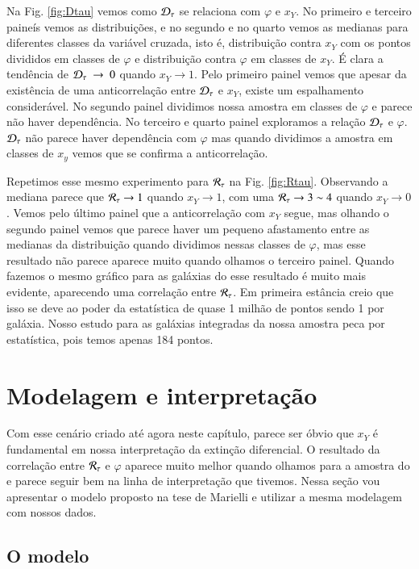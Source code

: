 Na Fig. \ref{fig:Dtau} vemos como $\mathcal{D}_\tau$ se relaciona com $\varphi$ e $x_Y$. No primeiro e
terceiro paineís vemos as distribuições, e no segundo e no quarto vemos as medianas para diferentes
classes da variável cruzada, isto é, distribuição contra $x_Y$ com os pontos divididos em classes de
$\varphi$ e distribuição contra $\varphi$ em classes de $x_Y$. É clara a tendência de $\mathcal{D}_\tau\ \to\
0$ quando $x_Y \to 1$. Pelo primeiro painel vemos que apesar da existência de uma anticorrelação
entre $\mathcal{D}_\tau$ e $x_Y$, existe um espalhamento considerável. No segundo painel dividimos nossa
amostra em classes de $\varphi$ e parece não haver dependência. No terceiro e quarto painel
exploramos a relação $\mathcal{D}_\tau$ e $\varphi$. $\mathcal{D}_\tau$ não parece haver dependência com $\varphi$ mas
quando dividimos a amostra em classes de $x_y$ vemos que se confirma a anticorrelação.

Repetimos esse mesmo experimento para $\mathcal{R}_\tau$ na Fig. \ref{fig:Rtau}. Observando a mediana parece
que $\mathcal{R}_\tau \to 1$ quando $x_Y \to 1$, com uma $\mathcal{R}_\tau \to 3 \sim 4$ quando $x_Y \to 0$. Vemos pelo
último painel que a anticorrelação com $x_Y$ segue, mas olhando o segundo painel vemos que parece
haver um pequeno afastamento entre as medianas da distribuição quando dividimos nessas classes de
$\varphi$, mas esse resultado não parece aparece muito quando olhamos o terceiro painel. Quando
fazemos o mesmo gráfico para as galáxias do \SDSS esse resultado é muito mais evidente, aparecendo
uma correlação entre $\mathcal{R}_\tau$. Em primeira estância creio que isso se deve ao poder da estatística de
quase 1 milhão de pontos sendo 1 por galáxia. Nosso estudo para as galáxias integradas da nossa
amostra peca por estatística, pois temos apenas 184 pontos.

\section{Modelagem e interpretação}
\label{sec:difextin:modeleinterp}
Com esse cenário criado até agora neste capítulo, parece ser óbvio que $x_Y$ é fundamental em nossa
interpretação da extinção diferencial. O resultado da correlação entre $\mathcal{R}_\tau$ e $\varphi$ aparece
muito melhor quando olhamos para a amostra do \SDSS e parece seguir bem na linha de interpretação
que tivemos. Nessa seção vou apresentar o modelo proposto na tese de Marielli e utilizar a mesma
modelagem com nossos dados.

\subsection{O modelo}
\label{sec:difextin:modeleinterp:model}

